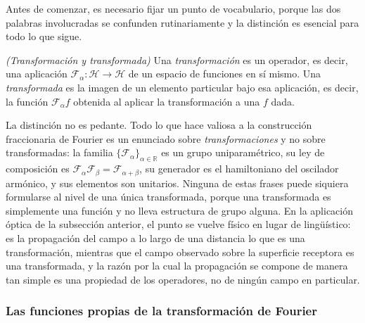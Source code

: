 		Antes de comenzar, es necesario fijar un punto de vocabulario, porque las dos palabras involucradas se confunden rutinariamente y la distinción es esencial para todo lo que sigue.

		\begin{myDef}
			\textit{(Transformación y transformada)} Una \textit{transformación} es un operador, es decir, una aplicación $\mathcal{F}_{\alpha} : \mathcal{H} \to \mathcal{H}$ de un espacio de funciones en sí mismo. Una \textit{transformada} es la imagen de un elemento particular bajo esa aplicación, es decir, la función $\mathcal{F}_{\alpha}f$ obtenida al aplicar la transformación a una $f$ dada.
		\end{myDef}

		La distinción no es pedante. Todo lo que hace valiosa a la construcción fraccionaria de Fourier es un enunciado sobre \textit{transformaciones} y no sobre transformadas: la familia $\{\mathcal{F}_{\alpha}\}_{\alpha\in\mathbb{R}}$ es un grupo uniparamétrico, su ley de composición es $\mathcal{F}_{\alpha}\mathcal{F}_{\beta} = \mathcal{F}_{\alpha+\beta}$, su generador es el hamiltoniano del oscilador armónico, y sus elementos son unitarios. Ninguna de estas frases puede siquiera formularse al nivel de una única transformada, porque una transformada es simplemente una función y no lleva estructura de grupo alguna. En la aplicación óptica de la subsección anterior, el punto se vuelve físico en lugar de lingüístico: es la propagación del campo a lo largo de una distancia lo que es una transformación, mientras que el campo observado sobre la superficie receptora es una transformada, y la razón por la cual la propagación se compone de manera tan simple es una propiedad de los operadores, no de ningún campo en particular.

		\subsubsection{Las funciones propias de la transformación de Fourier}

